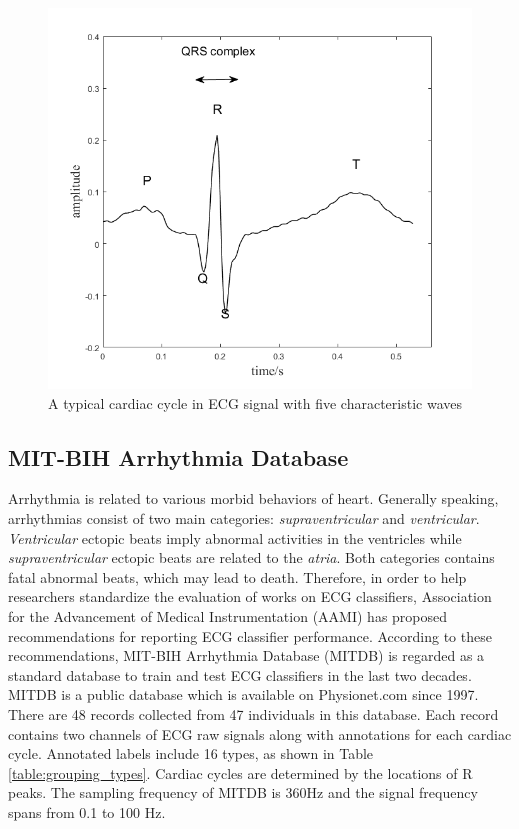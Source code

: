  \begin{figure}[t]
 	\centering
 	\includegraphics[scale=0.75]{Fig/cardiac_cycle.png}
 	\caption{A typical cardiac cycle in ECG signal with five characteristic waves}
 	\label{fig:cardiac_cycle}
 \end{figure}

\subsection{MIT-BIH Arrhythmia Database}

Arrhythmia is related to various morbid behaviors of heart. Generally speaking, arrhythmias consist of two main categories: \textit{supraventricular} and \textit{ventricular}. \textit{Ventricular} ectopic beats imply abnormal activities in the ventricles while \textit{supraventricular} ectopic beats are related to the \textit{atria}\cite{houghton2014making}. Both categories contains fatal abnormal beats, which may lead to death\cite{ng2006treating}. Therefore, in order to help researchers standardize the evaluation of works on ECG classifiers, Association for the Advancement of Medical Instrumentation (AAMI) has proposed recommendations for reporting ECG classifier performance\cite{aami}. 
According to these recommendations, MIT-BIH Arrhythmia Database (MITDB) is regarded as a standard database to train and test ECG classifiers in the last two decades. MITDB is a public database which is available on Physionet.com \cite{physionet} since 1997\cite{mitdb}. There are 48 records collected from 47 individuals in this database. Each record contains two channels of ECG raw signals along with annotations for each cardiac cycle. Annotated labels include 16 types, as shown in Table \ref{table:grouping_types}. Cardiac cycles are determined by the locations of R peaks. %
The sampling frequency of MITDB is 360Hz and the signal frequency spans from 0.1 to 100 Hz. 

